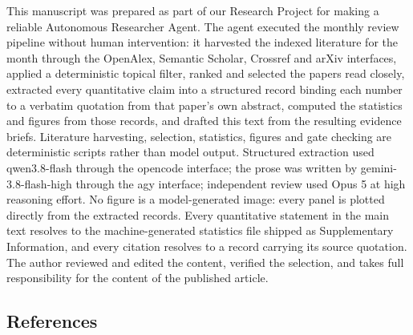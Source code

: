 \documentclass[
  11pt,
]{article}
\begin{document}
This manuscript was prepared as part of our Research Project for making
a reliable Autonomous Researcher Agent. The agent executed the monthly
review pipeline without human intervention: it harvested the indexed
literature for the month through the OpenAlex, Semantic Scholar,
Crossref and arXiv interfaces, applied a deterministic topical filter,
ranked and selected the papers read closely, extracted every
quantitative claim into a structured record binding each number to a
verbatim quotation from that paper's own abstract, computed the
statistics and figures from those records, and drafted this text from
the resulting evidence briefs. Literature harvesting, selection,
statistics, figures and gate checking are deterministic scripts rather
than model output. Structured extraction used qwen3.8-flash through the
opencode interface; the prose was written by gemini-3.8-flash-high
through the agy interface; independent review used Opus 5 at high
reasoning effort. No figure is a model-generated image: every panel is
plotted directly from the extracted records. Every quantitative
statement in the main text resolves to the machine-generated statistics
file shipped as Supplementary Information, and every citation resolves
to a record carrying its source quotation. The author reviewed and
edited the content, verified the selection, and takes full
responsibility for the content of the published article.

\subsection{References}\label{references}
\end{document}
